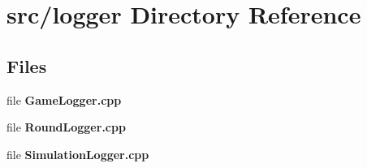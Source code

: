 \section{src/logger Directory Reference}
\label{dir_ffde1fbcaa8d6b0d34e29c3bddf7a801}
\subsection*{Files}
\begin{DoxyCompactItemize}
\item 
file {\bfseries Game\-Logger.\-cpp}
\item 
file {\bfseries Round\-Logger.\-cpp}
\item 
file {\bfseries Simulation\-Logger.\-cpp}
\end{DoxyCompactItemize}
